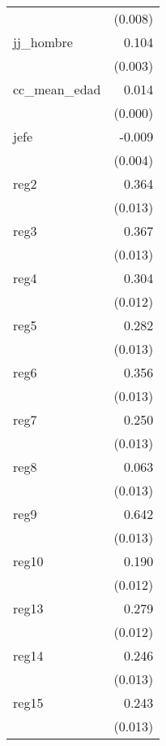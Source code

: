 {\begin{longtable}{l*{1}{D{.}{.}{-1}}}
            &     (0.008)         \\
\addlinespace
jj\_hombre   &       0.104\sym{***}\\
            &     (0.003)         \\
\addlinespace
cc\_mean\_edad&       0.014\sym{***}\\
            &     (0.000)         \\
\addlinespace
jefe        &      -0.009\sym{*}  \\
            &     (0.004)         \\
\addlinespace
reg2        &       0.364\sym{***}\\
            &     (0.013)         \\
\addlinespace
reg3        &       0.367\sym{***}\\
            &     (0.013)         \\
\addlinespace
reg4        &       0.304\sym{***}\\
            &     (0.012)         \\
\addlinespace
reg5        &       0.282\sym{***}\\
            &     (0.013)         \\
\addlinespace
reg6        &       0.356\sym{***}\\
            &     (0.013)         \\
\addlinespace
reg7        &       0.250\sym{***}\\
            &     (0.013)         \\
\addlinespace
reg8        &       0.063\sym{***}\\
            &     (0.013)         \\
\addlinespace
reg9        &       0.642\sym{***}\\
            &     (0.013)         \\
\addlinespace
reg10       &       0.190\sym{***}\\
            &     (0.012)         \\
\addlinespace
reg13       &       0.279\sym{***}\\
            &     (0.012)         \\
\addlinespace
reg14       &       0.246\sym{***}\\
            &     (0.013)         \\
\addlinespace
reg15       &       0.243\sym{***}\\
            &     (0.013)         \\

\end{longtable}}
